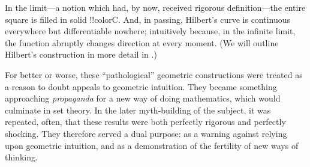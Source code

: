 \documentclass[../../../include/open-logic-section]{subfiles}
\begin{document}
In the limit---a notion which had, by now, received rigorous
definition---the entire square is filled in solid !!{colorC}. And, in
passing, Hilbert's curve is continuous everywhere but differentiable
nowhere; intuitively because, in the infinite limit, the function
abruptly changes direction at every moment. (We will outline Hilbert's
construction in more detail in .)

For better or worse, these ``pathological'' geometric constructions
were treated as a reason to doubt appeals to geometric intuition. They
became something approaching \emph{propaganda} for a new way of doing
mathematics, which would culminate in set theory. In the later
myth-building of the subject, it was repeated, often, that these
results were both perfectly rigorous and perfectly shocking. They
therefore served a dual purpose: as a warning against relying upon
geometric intuition, and as a demonstration of the fertility of new
ways of thinking. 
\end{document}
